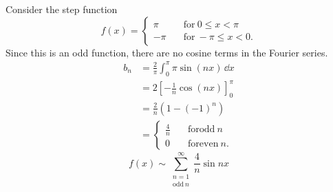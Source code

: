 \begin{Example}
  Consider the step function
  \[ f(x) = 
  \begin{cases}
    \pi \quad &\mathrm{for}\ 0 \leq x < \pi \\
    -\pi \quad &\mathrm{for}\ -\pi \leq x < 0.
  \end{cases}
  \]
  Since this is an odd function, there are no cosine terms in the Fourier
  series.
  \begin{align*}
    b_n     &= \frac{2}{\pi} \int_0^\pi \pi \sin(n x)\,\dd x \\
    &= 2 \left[ -\frac{1}{n} \cos(n x) \right]_0^\pi \\
    &= \frac{2}{n} (1 - (-1)^n) \\
    &=      \begin{cases}
      \frac{4}{n} \quad &\mathrm{for odd}\ n \\
      0 \quad &\mathrm{for even}\ n.
    \end{cases}
  \end{align*}
  \[ f(x) \sim \sum_{\substack{ {n} = 1 \\ \mathrm{odd}\ n}}^{\infty} \frac{4}{n} \sin{n x} \]


\end{Example}
